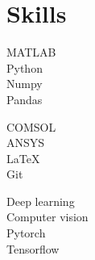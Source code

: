 \documentclass{my_cv}%
\begin{document}
\section{Skills}
\vspace{1em}
\begin{minipage}{0.35\textwidth}
    MATLAB \\           
  Python \\
  Numpy \\ 
  Pandas \\       
\end{minipage}
\begin{minipage}{0.35\textwidth}
   COMSOL \\
   ANSYS \\
   \LaTeX \\
   Git \\
\end{minipage}
\begin{minipage}{0.35\textwidth}
   Deep learning \\
   Computer vision \\
   Pytorch \\
   Tensorflow  \\
\end{minipage}

\end{document}
